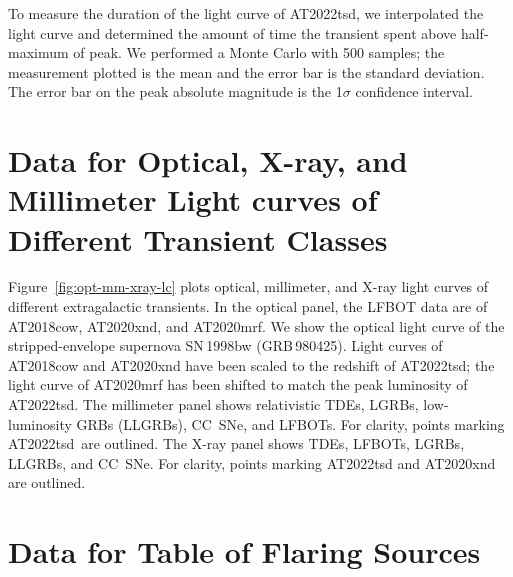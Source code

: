 \documentclass{nature_plusfigure}
\newcommand{\at}{AT2022tsd}
\begin{document}
\begin{methods}
To measure the duration of the light curve of \at, we interpolated the light curve and determined the amount of time the transient spent above half-maximum of peak. We performed a Monte Carlo with 500 samples; the measurement plotted is the mean and the error bar is the standard deviation. The error bar on the peak absolute magnitude is the 1$\sigma$ confidence interval. 

\section{Data for Optical, X-ray, and Millimeter Light curves of Different Transient Classes}
\label{sec:data-transient-lc}


Figure~\ref{fig:opt-mm-xray-lc} plots optical, millimeter, and X-ray light curves of different extragalactic transients. In the optical panel, the LFBOT data are of AT2018cow\cite{Perley2019,Ho2019,RiveraSandoval2018,Margutti2019}, AT2020xnd\cite{Perley2021,Ho2022_AT2020xnd,Bright2022}, and AT2020mrf\cite{Yao2022}. We show the optical light curve of the stripped-envelope supernova SN\,1998bw\cite{Galama1998} (GRB\,980425).
Light curves of AT2018cow and AT2020xnd have been scaled to the redshift of \at; the light curve of AT2020mrf has been shifted to match the peak luminosity of \at. The millimeter panel shows relativistic TDEs\cite{Zauderer2011,Yuan2016,Andreoni2022}, LGRBs\cite{Sheth2003,Perley2014,Laskar2018,Laskar2019}, low-luminosity GRBs (LLGRBs\cite{Kulkarni1998,Perley2017}), CC~SNe\cite{Weiler2007,Soderberg2010,Horesh2013,Corsi2014,Maeda2021}, and LFBOTs\cite{Ho2019,Ho2022_AT2020xnd}. For clarity, points marking \at\ are outlined. The X-ray panel shows TDEs\cite{Mangano2016,Andreoni2022}, LFBOTs\cite{RiveraSandoval2018,Margutti2019,Ho2019,Coppejans2020,Ho2022_AT2020xnd,Bright2022,Yao2022}, LGRBs\cite{Yao2022}, LLGRBs\cite{Kouveliotou2004,Tiengo2004,Campana2006,Soderberg2006,Margutti2013}, and CC~SNe\cite{Dwarkadas2012}. For clarity, points marking AT2022tsd and AT2020xnd are outlined.

\section{Data for Table of Flaring Sources}
\label{sec:data-table}


\end{methods}
\end{document}
